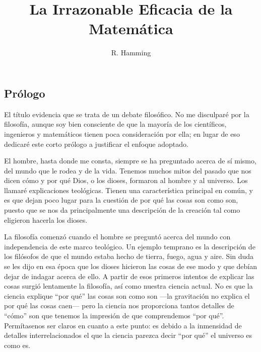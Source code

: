 \documentclass[a4paper, 12pt]{article}
\title{La Irrazonable Eficacia de la Matemática}
\author{R. Hamming}
\date{}
\begin{document}
\begin{tcolorbox}[colback=blue!5!white,colframe=blue!75!black]

\vspace{-1.8cm}
\textbf \maketitle

\end{tcolorbox}

\bigskip
 

\subsection*{Prólogo}

 El título evidencia que se trata de un debate filosófico. No me disculparé por la filosofía, aunque soy bien consciente de que la mayoría de los científicos, ingenieros y matemáticos tienen poca consideración por ella; en lugar de eso dedicaré este corto prólogo a justificar el enfoque adoptado.


El hombre, hasta donde me consta, siempre se ha preguntado acerca de sí mismo, del mundo que le rodea y de la vida. Tenemos muchos mitos del pasado que nos dicen cómo y por qué Dios, o los dioses, formaron al hombre y al universo. Los llamaré explicaciones teológicas. Tienen una característica principal en común, y es que dejan poco lugar para la cuestión de por qué las cosas son como son, puesto que se nos da principalmente una descripción de la creación tal como eligieron hacerla los dioses.

 

La filosofía comenzó cuando el hombre se preguntó acerca del mundo con independencia de este marco teológico. Un ejemplo temprano es la descripción de los filósofos de que el mundo estaba hecho de tierra, fuego, agua y aire. Sin duda se les dijo en esa época que los dioses hicieron las cosas de ese modo y que debían dejar de indagar acerca de ello. A partir de esos primeros intentos de explicar las cosas surgió lentamente la filosofía, así como nuestra ciencia actual. No es que la ciencia explique ``por qué'' las cosas son como son ---la gravitación no explica el por qué las cosas caen--- pero la ciencia nos proporciona tantos detalles de ``cómo'' son que tenemos la impresión de que comprendemos ``por qué''. Permítasenos ser claros en cuanto a este punto: es debido a la inmensidad de detalles interrelacionados el que la ciencia parezca decir ``por qué'' el universo es como es.
\end{document}

